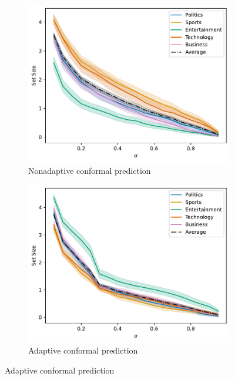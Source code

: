 \documentclass[a4paper, 12pt]{article}
\begin{document}
\begin{figure}[ht]
    \centering
    \begin{subfigure}[b]{0.5\linewidth}
        \includegraphics[width=\linewidth]{figures/nonadaptive_set_size.pdf}
        \caption{Nonadaptive conformal prediction}
        \label{fig:nonadaptive_set_size}
    \end{subfigure}
    \begin{subfigure}[b]{0.5\linewidth}
        \includegraphics[width=\linewidth]{figures/adaptive_set_size.pdf}
        \caption{Adaptive conformal prediction}
        \label{fig:adaptive_set_size}

\end{subfigure}
\end{figure}
\end{document}
